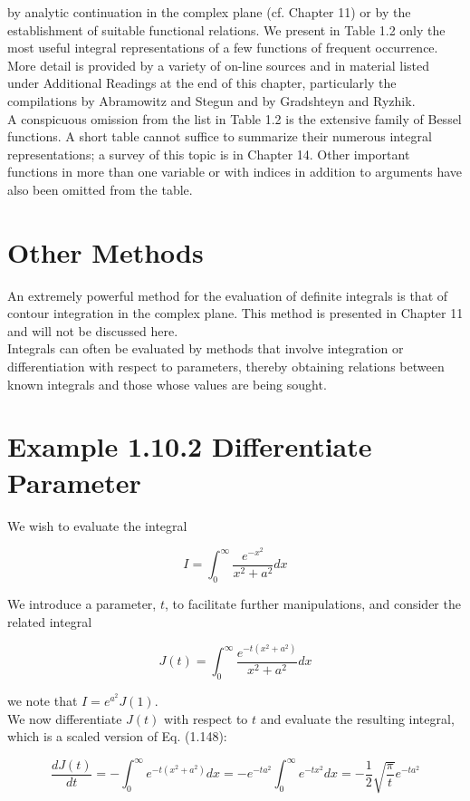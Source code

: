 \documentclass[10pt]{article}
\begin{document}
by analytic continuation in the complex plane (cf. Chapter 11) or by the establishment of suitable functional relations. We present in Table 1.2 only the most useful integral representations of a few functions of frequent occurrence. More detail is provided by a variety of on-line sources and in material listed under Additional Readings at the end of this chapter, particularly the compilations by Abramowitz and Stegun and by Gradshteyn and Ryzhik.\\
A conspicuous omission from the list in Table 1.2 is the extensive family of Bessel functions. A short table cannot suffice to summarize their numerous integral representations; a survey of this topic is in Chapter 14. Other important functions in more than one variable or with indices in addition to arguments have also been omitted from the table.

\section*{Other Methods}
An extremely powerful method for the evaluation of definite integrals is that of contour integration in the complex plane. This method is presented in Chapter 11 and will not be discussed here.\\
Integrals can often be evaluated by methods that involve integration or differentiation with respect to parameters, thereby obtaining relations between known integrals and those whose values are being sought.

\section*{Example 1.10.2 Differentiate Parameter}
We wish to evaluate the integral

$$
I=\int_{0}^{\infty} \frac{e^{-x^{2}}}{x^{2}+a^{2}} d x
$$

We introduce a parameter, $t$, to facilitate further manipulations, and consider the related integral

$$
J(t)=\int_{0}^{\infty} \frac{e^{-t\left(x^{2}+a^{2}\right)}}{x^{2}+a^{2}} d x
$$

we note that $I=e^{a^{2}} J(1)$.\\
We now differentiate $J(t)$ with respect to $t$ and evaluate the resulting integral, which is a scaled version of Eq. (1.148):


\begin{equation*}
\frac{d J(t)}{d t}=-\int_{0}^{\infty} e^{-t\left(x^{2}+a^{2}\right)} d x=-e^{-t a^{2}} \int_{0}^{\infty} e^{-t x^{2}} d x=-\frac{1}{2} \sqrt{\frac{\pi}{t}} e^{-t a^{2}} \tag{1.147}
\end{equation*}
\end{document}
